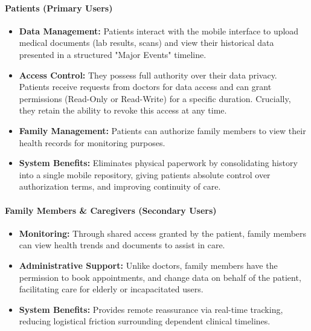 \paragraph{Patients (Primary Users)}
\begin{itemize}
    \item \textbf{Data Management:} Patients interact with the mobile interface to upload medical documents (lab results, scans) and view their historical data presented in a structured "Major Events" timeline.
    \item \textbf{Access Control:} They possess full authority over their data privacy. Patients receive requests from doctors for data access and can grant permissions (Read-Only or Read-Write) for a specific duration. Crucially, they retain the ability to revoke this access at any time.
    \item \textbf{Family Management:} Patients can authorize family members to view their health records for monitoring purposes.
    \item \textbf{System Benefits:} Eliminates physical paperwork by consolidating history into a single mobile repository, giving patients absolute control over authorization terms, and improving continuity of care.
\end{itemize}

\paragraph{Family Members \& Caregivers (Secondary Users)}
\begin{itemize}
    \item \textbf{Monitoring:} Through shared access granted by the patient, family members can view health trends and documents to assist in care.
    \item \textbf{Administrative Support:} Unlike doctors, family members have the permission to book appointments, and change data on behalf of the patient, facilitating care for elderly or incapacitated users.
    \item \textbf{System Benefits:} Provides remote reassurance via real-time tracking, reducing logistical friction surrounding dependent clinical timelines.
\end{itemize}

